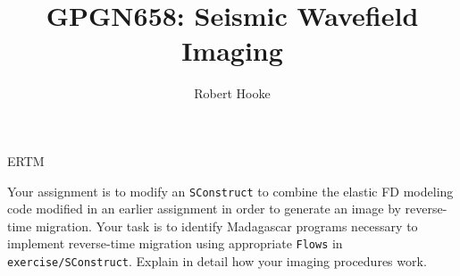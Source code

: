\author{Robert Hooke}
\title{GPGN658: Seismic Wavefield Imaging}{ERTM}

Your assignment is to modify an \texttt{SConstruct} to combine the
elastic FD modeling code modified in an earlier assignment in order to
generate an image by reverse-time migration. Your task is to identify
Madagascar programs necessary to implement reverse-time migration
using appropriate \texttt{Flows} in
\texttt{exercise/SConstruct}. Explain in detail how your imaging
procedures work.






%



